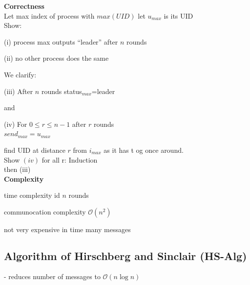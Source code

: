 \textbf{Correctness}\\
Let max index of process with $max(UID)$ let $u_{max}$ is its UID\\
Show:\\
\begin{compactitem}
\item[(i)] process max outputs ``leader'' after $n$ rounds
\item[(ii)] no other process does the same
\end{compactitem}

We clarify:\\
\begin{compactitem}
\item[(iii)] After $n$ rounds status$_{max}$=leader
\end{compactitem}
and\\
\begin{compactitem}
\item[(iv)] For $0\leq r\leq n-1$ after $r$ rounds\\
	$send_{max}=u_{max}$
\end{compactitem}
find UID at distance $r$ from $i_{max}$ as it has t og once around.\\

Show $(iv)$ for all r: Induction\\
then (iii)\\

\textbf{Complexity}\\
\begin{compactitem}
\item time complexity id $n$ rounds
\item communocation complexity $\mathcal{O}(n^2)$
\item not very expensive in time many messages

\end{compactitem}

\subsection{Algorithm of Hirschberg and Sinclair (HS-Alg)}
- reduces number of messages to $\mathcal{O}(n \log n)$\\

